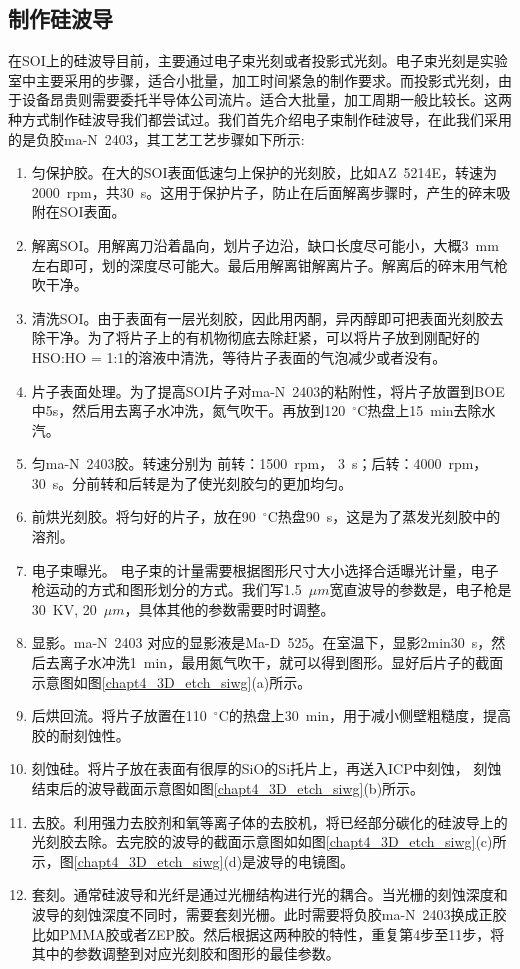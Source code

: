 \subsection{制作硅波导}\label{fab_siwg}
在SOI上的硅波导目前，主要通过电子束光刻或者投影式光刻。电子束光刻是实验室中主要采用的步骤，适合小批量，加工时间紧急的制作要求。而投影式光刻，由于设备昂贵则需要委托半导体公司流片。适合大批量，加工周期一般比较长。这两种方式制作硅波导我们都尝试过。我们首先介绍电子束制作硅波导，在此我们采用的是负胶ma-N~2403，其工艺工艺步骤如下所示:
\begin{enumerate}[(1)]
	\item 匀保护胶。在大的SOI表面低速匀上保护的光刻胶，比如AZ~5214E，转速为2000~rpm，共30~s。这用于保护片子，防止在后面解离步骤时，产生的碎末吸附在SOI表面。
	\item 解离SOI。用解离刀沿着晶向，划片子边沿，缺口长度尽可能小，大概3~mm左右即可，划的深度尽可能大。最后用解离钳解离片子。解离后的碎末用气枪吹干净。
	\item 清洗SOI。由于表面有一层光刻胶，因此用丙酮，异丙醇即可把表面光刻胶去除干净。为了将片子上的有机物彻底去除赶紧，可以将片子放到刚配好的HSO:HO = 1:1的溶液中清洗，等待片子表面的气泡减少或者没有。
	\item 片子表面处理。为了提高SOI片子对ma-N~2403的粘附性，将片子放置到BOE中5s，然后用去离子水冲洗，氮气吹干。再放到120~$^{\circ}$C热盘上15~min去除水汽。
	\item 匀ma-N~2403胶。转速分别为 前转：1500~rpm， 3~s；后转：4000~rpm，30~s。分前转和后转是为了使光刻胶匀的更加均匀。
	\item 前烘光刻胶。将匀好的片子，放在90~$^{\circ}$C热盘90~s，这是为了蒸发光刻胶中的溶剂。
	\item 电子束曝光。 电子束的计量需要根据图形尺寸大小选择合适曝光计量，电子枪运动的方式和图形划分的方式。我们写1.5~$\mu m$宽直波导的参数是，电子枪是30~KV, 20~$\mu m$，具体其他的参数需要时时调整。
	\item 显影。ma-N~2403 对应的显影液是Ma-D~525。在室温下，显影2min30~s，然后去离子水冲洗1~min，最用氮气吹干，就可以得到图形。显好后片子的截面示意图如图\ref{chapt4_3D_etch_siwg}(a)所示。
	\item 后烘回流。将片子放置在110~$^{\circ}$C的热盘上30~min，用于减小侧壁粗糙度，提高胶的耐刻蚀性。
	\item 刻蚀硅。将片子放在表面有很厚的SiO的Si托片上，再送入ICP中刻蚀， 刻蚀结束后的波导截面示意图如图\ref{chapt4_3D_etch_siwg}(b)所示。
	\item 去胶。利用强力去胶剂和氧等离子体的去胶机，将已经部分碳化的硅波导上的光刻胶去除。去完胶的波导的截面示意图如如图\ref{chapt4_3D_etch_siwg}(c)所示，图\ref{chapt4_3D_etch_siwg}(d)是波导的电镜图。
	\item 套刻。通常硅波导和光纤是通过光栅结构进行光的耦合。当光栅的刻蚀深度和波导的刻蚀深度不同时，需要套刻光栅。此时需要将负胶ma-N~2403换成正胶比如PMMA胶或者ZEP胶。然后根据这两种胶的特性，重复第4步至11步，将其中的参数调整到对应光刻胶和图形的最佳参数。
\end{enumerate}

